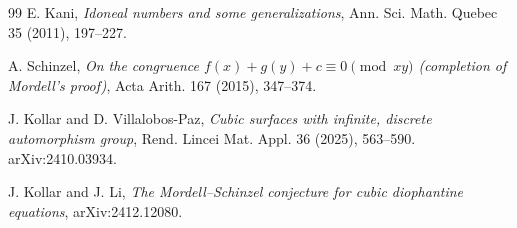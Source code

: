 \begin{thebibliography}{99}
E. Kani, \textit{Idoneal numbers and some generalizations}, Ann. Sci. Math.
Quebec 35 (2011), 197--227.

A. Schinzel, \textit{On the congruence
\(f(x)+g(y)+c\equiv0\pmod{xy}\) (completion of Mordell's proof)},
Acta Arith. 167 (2015), 347--374.

J. Kollar and D. Villalobos-Paz, \textit{Cubic surfaces with infinite,
discrete automorphism group}, Rend. Lincei Mat. Appl. 36 (2025), 563--590.
arXiv:2410.03934.

J. Kollar and J. Li, \textit{The Mordell--Schinzel conjecture for cubic
diophantine equations}, arXiv:2412.12080.

\end{thebibliography}
